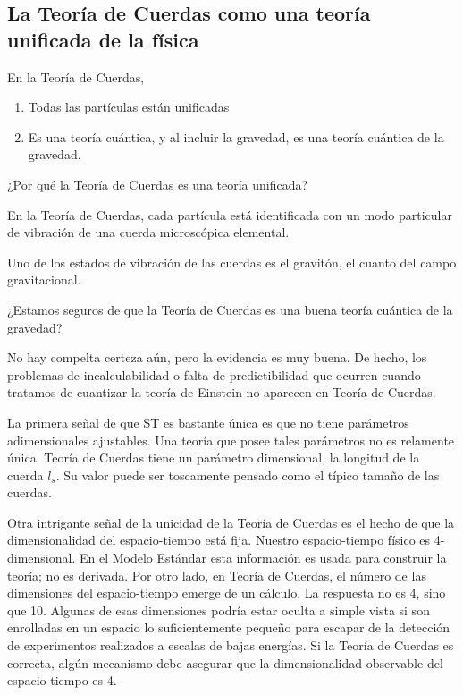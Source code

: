 \subsection{La Teoría de Cuerdas como una teoría unificada de la física}
En la Teoría de Cuerdas,
\begin{enumerate}
    \item Todas las partículas están unificadas
    \item Es una teoría cuántica, y al incluir la gravedad, es una teoría cuántica de la gravedad.
\end{enumerate}

\begin{pregunta}
    ¿Por qué la Teoría de Cuerdas es una teoría unificada?
\end{pregunta}
En la Teoría de Cuerdas, cada partícula está identificada con un modo particular de vibración de una cuerda microscópica elemental.

Uno de los estados de vibración de las cuerdas es el gravitón, el cuanto del campo gravitacional.

\begin{pregunta}
  ¿Estamos seguros de que la Teoría de Cuerdas es una buena teoría cuántica de la gravedad?  
\end{pregunta}
No hay compelta certeza aún, pero la evidencia es muy buena. De hecho, los problemas de incalculabilidad o falta de predictibilidad que ocurren cuando tratamos de cuantizar la teoría de Einstein no aparecen en Teoría de Cuerdas.

La primera señal de que ST es bastante única es que no tiene parámetros adimensionales ajustables. Una teoría que posee tales parámetros no es relamente única. Teoría de Cuerdas tiene un parámetro dimensional, la longitud de la cuerda $l_s$. Su valor puede ser toscamente pensado como el típico tamaño de las cuerdas.

Otra intrigante señal de la unicidad de la Teoría de Cuerdas es el hecho de que la dimensionalidad del espacio-tiempo está fija. Nuestro espacio-tiempo físico es 4-dimensional. En el Modelo Estándar esta información es usada para construir la teoría; no es derivada. Por otro lado, en Teoría de Cuerdas, el número de las dimensiones del espacio-tiempo emerge de un cálculo. La respuesta no es 4, sino que 10. Algunas de esas dimensiones podría estar oculta a simple vista si son enrolladas en un espacio lo suficientemente pequeño para escapar de la detección de experimentos realizados a escalas de bajas energías. Si la Teoría de Cuerdas es correcta, algún mecanismo debe asegurar que la dimensionalidad observable del espacio-tiempo es 4.


